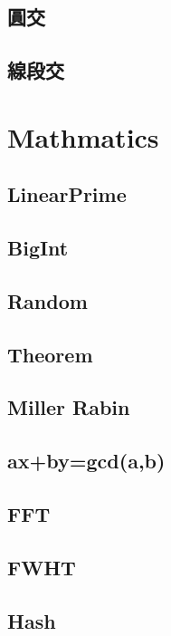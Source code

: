 \subsection{圓交}

\subsection{線段交}


\section{Mathmatics}

\subsection{LinearPrime}

\subsection{BigInt}

\subsection{Random}

\subsection{Theorem}

\subsection{Miller Rabin}

\subsection{ax+by=gcd(a,b)}

\subsection{FFT}

\subsection{FWHT}

\subsection{Hash}

